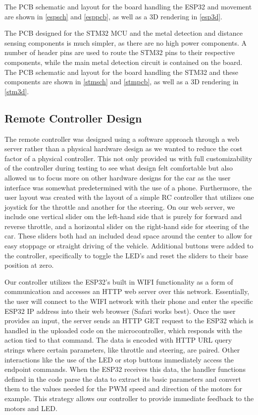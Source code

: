 \documentclass[11pt]{article}
\begin{document}
The PCB schematic and layout for the board handling the ESP32 and movement are shown in \autoref{espsch} and \autoref{esppcb}, as well as a 3D rendering in \autoref{esp3d}.

The PCB designed for the STM32 MCU and the metal detection and distance sensing components is much simpler, as there are no high power components. A number of header pins are used to route the STM32 pins to their respective components, while the main metal detection circuit is contained on the board. The PCB schematic and layout for the board handling the STM32 and these components are shown in \autoref{stmsch} and \autoref{stmpcb}, as well as a 3D rendering in \autoref{stm3d}.

\subsection{Remote Controller Design}
The remote controller was designed using a software approach through a web server rather than a physical hardware design as we wanted to reduce the cost factor of a physical controller. This not only provided us with full customizability of the controller during testing to see what design felt comfortable but also allowed us to focus more on other hardware designs for the car as the user interface was somewhat predetermined with the use of a phone. Furthermore, the user layout was created with the layout of a simple RC controller that utilizes one joystick for the throttle and another for the steering. On our web server, we include one vertical slider om the left-hand side that is purely for forward and reverse throttle, and a horizontal slider on the right-hand side for steering of the car. These sliders both had an included dead space around the center to allow for easy stoppage or straight driving of the vehicle. Additional buttons were added to the controller, specifically to toggle the LED's and reset the sliders to their base position at zero.

Our controller utilizes the ESP32's built in WIFI functionality as a form of communication and accesses an HTTP web server over this network. Essentially, the user will connect to the WIFI network with their phone and enter the specific ESP32 IP address into their web browser (Safari works best). Once the user provides an input, the server sends an HTTP GET request to the ESP32 which is handled in the uploaded code on the microcontroller, which responds with the action tied to that command. The data is encoded with HTTP URL query strings where certain parameters, like throttle and steering, are paired. Other interactions like the use of the LED or stop buttons immediately access the endpoint commands. When the ESP32 receives this data, the handler functions defined in the code parse the data to extract its basic parameters and convert them to the values needed for the PWM speed and direction of the motors for example. This strategy allows our controller to provide immediate feedback to the motors and LED.
\end{document}
